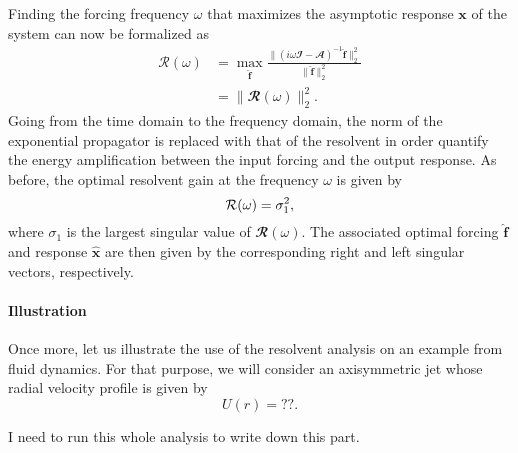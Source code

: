     Finding the forcing frequency $\omega$ that maximizes the asymptotic response $\mathbf{x}$ of the system can now be formalized as
    \begin{equation}
      \begin{aligned}
        \mathcal{R}(\omega) & = \max_{\hat{\mathbf{f}}} \displaystyle \frac{\| \left( i \omega \mathbfcal{I} - \mathbfcal{A} \right)^{-1} \hat{\mathbf{f}} \|_2^2}{\| \hat{\mathbf{f}} \|_2^2} \\
        & = \| \mathbfcal{R}(\omega) \|_2^2.
      \end{aligned}
      \label{eq: theory -- resolvent norm}
    \end{equation}
    Going from the time domain to the frequency domain, the norm of the exponential propagator is replaced with that of the resolvent in order quantify the energy amplification between the input forcing and the output response. As before, the optimal resolvent gain at the frequency $\omega$ is given by
    \begin{equation}
      \mathcal{R}(\omega) = \sigma_1^2,
      \notag
    \end{equation}
    where $\sigma_1$ is the largest singular value of $\mathbfcal{R}(\omega)$. The associated optimal forcing $\hat{\mathbf{f}}$ and response $\hat{\mathbf{x}}$ are then given by the corresponding right and left singular vectors, respectively.

    \paragraph{Illustration}

    Once more, let us illustrate the use of the resolvent analysis on an example from fluid dynamics. For that purpose, we will consider an axisymmetric jet whose radial velocity profile is given by
    \begin{equation}
      U(r) = ??.
      \label{eq: theory -- resolvent analysis - jet profile}
    \end{equation}

    {\color{red} I need to run this whole analysis to write down this part.}

